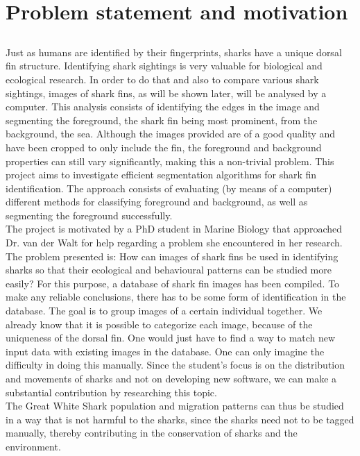 \documentclass[a4paper,10pt]{article}
\begin{document}
\newpage
\tableofcontents

\newpage
\section{Problem statement and motivation}
\subsection{}
Just as humans are identified by their fingerprints, sharks have a unique
dorsal fin structure.  Identifying shark sightings is very
valuable for biological and ecological research.  In order to do that and also to compare various shark sightings,
images of
shark fins, as will be shown later, will be analysed by a computer. 
This analysis consists of identifying the edges in the image and segmenting the
foreground, the shark fin being most prominent,  from the background, the sea. 
Although the images provided are of a good quality and have been cropped
to only include the fin, the
foreground and background properties can still vary significantly, making this a
non-trivial problem.  This project aims to investigate efficient segmentation
algorithms for shark fin identification.  The approach consists of
evaluating (by means of a computer) different methods for classifying foreground
and background, as well as segmenting the foreground successfully.  \\

The project is motivated by a PhD
student in Marine Biology that approached Dr. van der Walt for
help regarding a problem she encountered in her research.
The problem presented is: How can images of shark fins be used in identifying sharks so that their
ecological and behavioural patterns can be studied more easily?
For this purpose, a database of shark fin images has been compiled.
To
make any reliable conclusions, there has to be some form of identification in the
database. 
The goal is to group images of a certain individual together.  We
already know that it is possible to categorize each image, because of the
uniqueness of the dorsal fin.  One would just have to find a way to match new
input data with existing images in the database.  One can only imagine the
difficulty in doing this manually. 
Since the student's 
focus is on the distribution and movements of sharks and not on developing new
software, we can make a substantial contribution by researching this topic. \\

The Great White Shark population and migration patterns can thus be studied in a way that is not harmful to the sharks, since the sharks need not to be tagged manually, thereby contributing in the conservation of sharks and the environment.  
\end{document}
